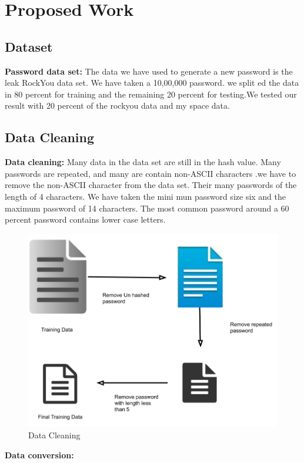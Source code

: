 \documentclass[runningheads]{llncs}
\begin{document}
\section{Proposed Work}
\newline
\subsection{Dataset}
\textbf{Password data set:}
The data we have used to generate a new password is the leak RockYou data set. We have taken a 10,00,000 password. we split ed the data in 80 percent for training and the remaining 20 percent for testing.We tested our result with 20 percent of the rockyou data and my space data.
\subsection{Data Cleaning}
\textbf{Data cleaning:}
Many data in the data set are still in the hash value. Many passwords are repeated, and many are contain non-ASCII characters .we have to remove the non-ASCII character from the data set. Their many passwords of the length of 4 characters. We have taken the mini mun password size six and the maximum password of 14 characters. The most common password around a 60 percent password contains lower case letters.
\newline
\begin{figure}[ht!] %
\centering
\includegraphics[width=4 in]{cleaning.png}
\caption{Data Cleaning}
\label{LP}
\end{figure}
\newline
\textbf{Data conversion:}
\end{document}
